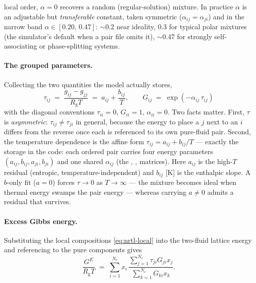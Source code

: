 \documentclass[11pt,a4paper]{article}
\newcommand{\Rgas}{R_{\!\mathrm{g}}}                %
\newcommand{\Gex}{G^{E}}
\begin{document}
local order, $\alpha=0$ recovers a random (regular-solution) mixture.
In practice $\alpha$ is an adjustable but \emph{transferable} constant,
taken symmetric ($\alpha_{ij}=\alpha_{ji}$) and in the narrow band
$\alpha\in[0.20,\,0.47]$: $\sim\!0.2$ near ideality, $0.3$ for typical
polar mixtures (the simulator's default when a pair file omits it),
$\sim\!0.47$ for strongly self-associating or phase-splitting systems.

\paragraph{The grouped parameters.}
Collecting the two quantities the model actually stores,
\begin{equation}
   \boxed{\;
   \tau_{ij} \;=\; \frac{g_{ij}-g_{jj}}{\Rgas T}
             \;=\; a_{ij} + \frac{b_{ij}}{T}, \qquad
   G_{ij}    \;=\; \exp(-\alpha_{ij}\, \tau_{ij})
   \;}
   \label{eq:nrtl-tauG}
\end{equation}
with the diagonal conventions $\tau_{ii}=0$, $G_{ii}=1$,
$\alpha_{ii}=0$. Two facts matter. First, $\tau$ is \emph{asymmetric}:
$\tau_{ij}\ne\tau_{ji}$ in general, because the energy to place a $j$
next to an $i$ differs from the reverse once each is referenced to its
own pure-fluid pair. Second, the temperature dependence is the affine
form $\tau_{ij}=a_{ij}+b_{ij}/T$ --- exactly the storage in the code:
each ordered pair carries four energy parameters
$(a_{ij},b_{ij},a_{ji},b_{ji})$ and one shared $\alpha_{ij}$ (the
, ,  matrices). Here
$a_{ij}$ is the high-$T$ residual (entropic, temperature-independent)
and $b_{ij}$ [K] is the enthalpic slope. A $b$-only fit ($a=0$) forces
$\tau\to0$ as $T\to\infty$ --- the mixture becomes ideal when thermal
energy swamps the pair energy --- whereas carrying $a\ne0$ admits a
residual that survives.

\paragraph{Excess Gibbs energy.}
Substituting the local compositions \eqref{eq:nrtl-local} into the
two-fluid lattice energy and referencing to the pure components gives
\begin{equation}
   \frac{\Gex}{\Rgas T} \;=\; \sum_{i=1}^{N_c}
       x_i \, \frac{\displaystyle\sum_{j=1}^{N_c} \tau_{ji} G_{ji} x_j}
                  {\displaystyle\sum_{k=1}^{N_c} G_{ki} x_k}.
   \label{eq:nrtl-GE}
\end{equation}
\end{document}
